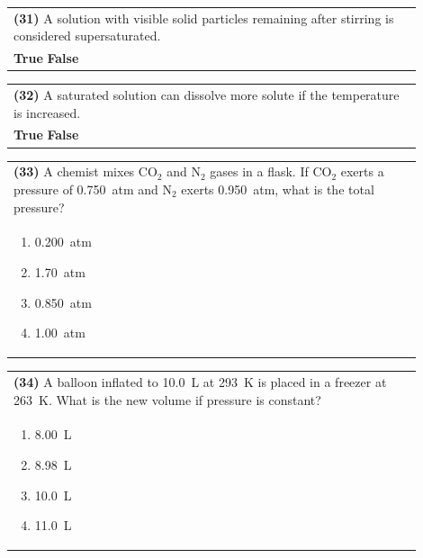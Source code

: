 \documentclass{article}
\begin{document}
\vspace{0.2cm}
\noindent\begin{tabular}{|p{0.9\linewidth}|}
\hline
\textbf{(31)} A solution with visible solid particles remaining after stirring is considered supersaturated.\\[0.2cm]
\textbf{True} \hspace{1cm} \textbf{False}\\[0.2cm]
\hline
\end{tabular}

\vspace{0.2cm}
\noindent\begin{tabular}{|p{0.9\linewidth}|}
\hline
\textbf{(32)} A saturated solution can dissolve more solute if the temperature is increased.\\[0.2cm]
\textbf{True} \hspace{1cm} \textbf{False}\\[0.2cm]
\hline
\end{tabular}
\newpage

\vspace{0.2cm}
\noindent\begin{tabular}{|p{0.9\linewidth}|}
\hline
\textbf{(33)} A chemist mixes CO$_2$ and N$_2$ gases in a flask. If CO$_2$ exerts a pressure of 0.750~atm and N$_2$ exerts 0.950~atm, what is the total pressure?\\[0.2cm]
\begin{minipage}[t]{0.85\linewidth}
\begin{enumerate}[label=\alph*.]
\item 0.200~atm
\item 1.70~atm
\item 0.850~atm
\item 1.00~atm
\end{enumerate}
\end{minipage}\\[0.2cm]
\hline
\end{tabular}

\vspace{0.2cm}
\noindent\begin{tabular}{|p{0.9\linewidth}|}
\hline
\textbf{(34)} A balloon inflated to 10.0~L at 293~K is placed in a freezer at 263~K. What is the new volume if pressure is constant?\\[0.2cm]
\begin{minipage}[t]{0.85\linewidth}
\begin{enumerate}[label=\alph*.]
\item 8.00~L
\item 8.98~L
\item 10.0~L
\item 11.0~L
\end{enumerate}
\end{minipage}\\[0.2cm]
\hline
\end{tabular}
\end{document}

